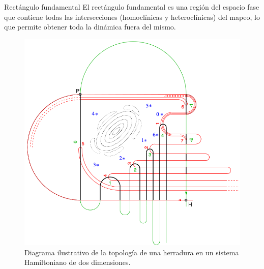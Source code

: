 \documentclass[11pt]{beamer}
\theoremstyle{definition}
\begin{document}
\begin{frame}{Rect\'angulo fundamental}
El rect\'angulo fundamental es una región del espacio fase que contiene todas las intersecciones (homoclínicas y heteroclínicas) del mapeo, lo que permite obtener toda la dinámica fuera del mismo.
\begin{figure}
\centering
\includegraphics[scale=0.20]{herradura}
\caption{Diagrama ilustrativo de la topología de una herradura en un sistema Hamiltoniano de dos dimensiones. }
\label{herradura}
\end{figure}

\end{frame}
\end{document}

